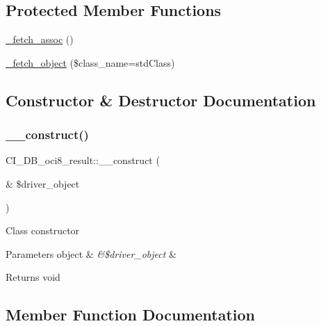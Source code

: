 \subsection*{Protected Member Functions}
\begin{DoxyCompactItemize}
\item 
\mbox{\hyperlink{class_c_i___d_b__oci8__result_a84ee5c1165c3b514953566669a748027}{\+\_\+fetch\+\_\+assoc}} ()
\item 
\mbox{\hyperlink{class_c_i___d_b__oci8__result_ade59d712eb60e96b67dfe597763d46bc}{\+\_\+fetch\+\_\+object}} (\$class\+\_\+name=\textquotesingle{}std\+Class\textquotesingle{})
\end{DoxyCompactItemize}


\subsection{Constructor \& Destructor Documentation}
\mbox{\label{class_c_i___d_b__oci8__result_a71a63830335b5a984ec717a23810780d}} 
\subsubsection{\texorpdfstring{\+\_\+\+\_\+construct()}{\_\_construct()}}
{\footnotesize\ttfamily C\+I\+\_\+\+D\+B\+\_\+oci8\+\_\+result\+::\+\_\+\+\_\+construct (\begin{DoxyParamCaption}\item[{\&}]{\$driver\+\_\+object }\end{DoxyParamCaption})}

Class constructor


\begin{DoxyParams}[1]{Parameters}
object & {\em \&\$driver\+\_\+object} & \\
\hline
\end{DoxyParams}
\begin{DoxyReturn}{Returns}
void 
\end{DoxyReturn}


\subsection{Member Function Documentation}
\mbox{\label{class_c_i___d_b__oci8__result_a84ee5c1165c3b514953566669a748027}} 
